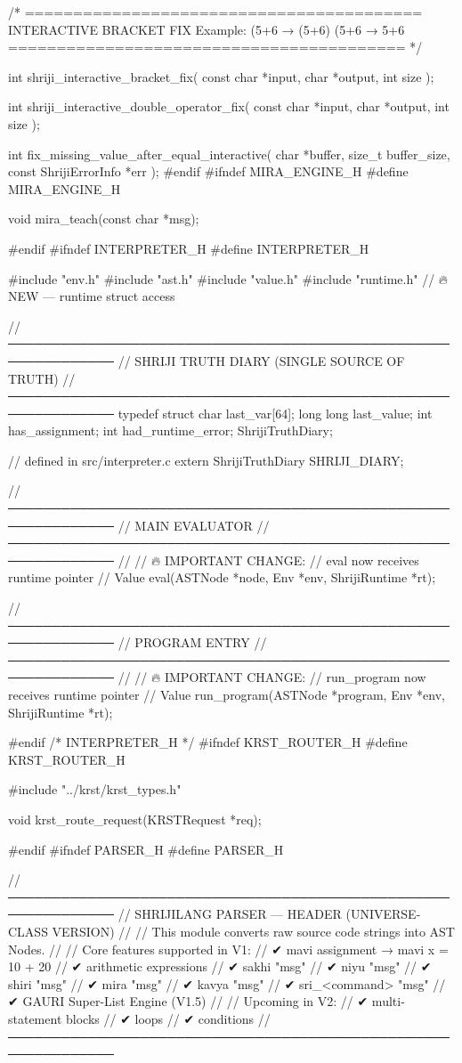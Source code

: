 \documentclass{article}
\begin{document}
/* =========================================
   INTERACTIVE BRACKET FIX
   Example: (5+6 → (5+6)
            (5+6 → 5+6
   ========================================= */

int shriji_interactive_bracket_fix(
    const char *input,
    char *output,
    int size
);

int shriji_interactive_double_operator_fix(
    const char *input,
    char *output,
    int size
);

int fix_missing_value_after_equal_interactive(
    char *buffer,
    size_t buffer_size,
    const ShrijiErrorInfo *err
);
#endif
#ifndef MIRA_ENGINE_H
#define MIRA_ENGINE_H

void mira_teach(const char *msg);

#endif
#ifndef INTERPRETER_H
#define INTERPRETER_H

#include "env.h"
#include "ast.h"
#include "value.h"
#include "runtime.h"   // 🔥 NEW — runtime struct access

//──────────────────────────────────────────────────────────────
// SHRIJI TRUTH DIARY (SINGLE SOURCE OF TRUTH)
//──────────────────────────────────────────────────────────────
typedef struct {
    char last_var[64];
    long long last_value;
    int has_assignment;
    int had_runtime_error;
} ShrijiTruthDiary;

// defined in src/interpreter.c
extern ShrijiTruthDiary SHRIJI_DIARY;


//──────────────────────────────────────────────────────────────
// MAIN EVALUATOR
//──────────────────────────────────────────────────────────────
//
// 🔥 IMPORTANT CHANGE:
// eval now receives runtime pointer
//
Value eval(ASTNode *node, Env *env, ShrijiRuntime *rt);


//──────────────────────────────────────────────────────────────
// PROGRAM ENTRY
//──────────────────────────────────────────────────────────────
//
// 🔥 IMPORTANT CHANGE:
// run_program now receives runtime pointer
//
Value run_program(ASTNode *program, Env *env, ShrijiRuntime *rt);


#endif /* INTERPRETER_H */
#ifndef KRST_ROUTER_H
#define KRST_ROUTER_H

#include "../krst/krst_types.h"

void krst_route_request(KRSTRequest *req);

#endif
#ifndef PARSER_H
#define PARSER_H

//──────────────────────────────────────────────────────────────
//  SHRIJILANG PARSER — HEADER (UNIVERSE-CLASS VERSION)
//
//  This module converts raw source code strings into AST Nodes.
//  
//  Core features supported in V1:
//    ✔ mavi assignment       → mavi x = 10 + 20
//    ✔ arithmetic expressions
//    ✔ sakhi "msg"
//    ✔ niyu "msg"
//    ✔ shiri "msg"
//    ✔ mira "msg"
//    ✔ kavya "msg"
//    ✔ sri_<command> "msg"
//    ✔ GAURI Super-List Engine (V1.5)
//
//  Upcoming in V2:
//    ✔ multi-statement blocks { }
//    ✔ loops
//    ✔ conditions
//──────────────────────────────────────────────────────────────
\end{document}
